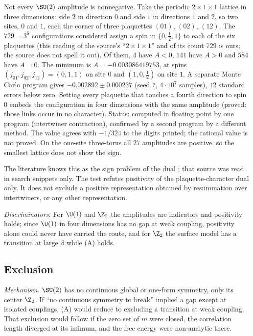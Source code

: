 \begin{observation}\label{neg:obs-dual}
Not every $\SU(2)$ amplitude is nonnegative. Take the periodic $2\times1\times1$ lattice in three
dimensions: side $2$ in direction $0$ and side $1$ in directions $1$ and $2$, so two sites, $0$ and
$1$, each the corner of three plaquettes $(01)$, $(02)$, $(12)$. The $729=3^6$ configurations
considered assign a spin in $\{0,\tfrac12,1\}$ to each of the six plaquettes (this reading of the
source's ``$2\times1\times1$'' and of its count $729$ is ours; the source does not spell it out).
Of them, $4$ have $A<0$, $141$ have $A>0$ and $584$ have $A=0$. The minimum is $A=-0.003086419753$, at spins $(j_{01},j_{02},j_{12})=(0,1,1)$ on
site $0$ and $(1,0,\frac12)$ on site $1$. A separate Monte Carlo program gives
$-0.002892\pm0.000237$ (seed $7$, $4\cdot10^7$ samples), $12$ standard errors below zero.
Setting every plaquette that touches a fourth direction to spin $0$ embeds the configuration in
four dimensions with the same amplitude (proved: those links occur in no character).
Status: computed in floating point by one program (intertwiner contraction), confirmed by a
second program by a different method. The value agrees with $-1/324$ to the digits printed;
the rational value is not proved. On the one-site three-torus all $27$ amplitudes are positive,
so the smallest lattice does not show the sign.
\end{observation}

The literature knows this as the sign problem of the dual \cite{CCK07}; that source was read in
search snippets only. The test refutes positivity of the plaquette-character dual only. It does
not exclude a positive representation obtained by resummation over intertwiners, or any other
representation.

\emph{Discriminators.} For $\U(1)$ and $\Z_2$ the amplitudes are indicators and positivity holds;
since $\U(1)$ in four dimensions has no gap at weak coupling, positivity alone could never have
carried the route, and for $\Z_2$ the surface model has a transition at large $\beta$ while (A)
holds.

\subsection{Exclusion}\label{neg:sub-excl}

\emph{Mechanism.} $\SU(2)$ has no continuous global or one-form symmetry, only its center
$\Z_2$. If ``no continuous symmetry to break'' implied a gap except at isolated couplings, (A)
would reduce to excluding a transition at weak coupling. That exclusion would follow if the
zero set of $m$ were closed, the correlation length diverged at its infimum, and the free energy
were non-analytic there.

